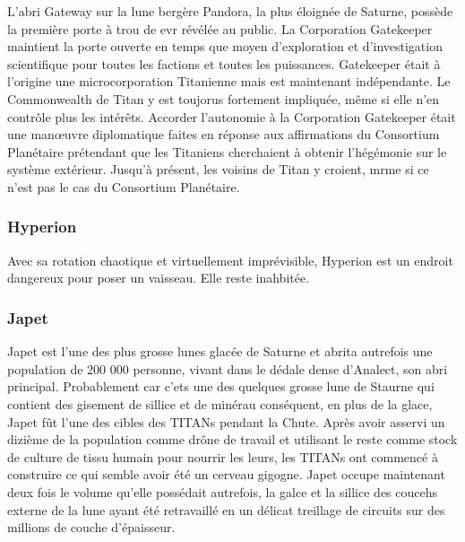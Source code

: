                                                                      L'abri Gateway sur la lune bergère Pandora, la plus éloignée de Saturne, possède la première porte à trou de evr révélée au public. La Corporation Gatekeeper maintient la porte ouverte en temps que moyen d'exploration et d'investigation scientifique pour toutes les factions et toutes les puissances. Gatekeeper était à l'origine une microcorporation Titanienne mais est maintenant indépendante. Le Commonwealth de Titan y est toujorus fortement impliquée, même si elle n'en contrôle plus les intérêts. Accorder l'autonomie à la Corporation Gatekeeper était une manœuvre diplomatique faites en réponse aux affirmations du Consortium Planétaire prétendant que les Titaniens cherchaient à obtenir l'hégémonie sur le système extérieur. Jusqu'à présent, les voisins de Titan y croient, mrme si ce n'est pas le cas du Consortium Planétaire. 

                                                                     \subsubsection{Hyperion} \label{sec:hyperion} 

                                                                     Avec sa rotation chaotique et virtuellement imprévisible, Hyperion est un endroit dangereux pour poser un vaisseau. Elle reste inahbitée. 

                                                                     \subsubsection{Japet} \label{sec:iapetus} 

                                                                     Japet est l'une des plus grosse lunes glacée de Saturne et abrita autrefois une population de 200 000 personne, vivant dans le dédale dense d'Analect, son abri principal. Probablement car c'ets une des quelques grosse lune de Staurne qui contient des gisement de sillice et de minérau conséquent, en plus de la glace, Japet fût l'une des cibles des TITANs pendant la Chute. Après avoir asservi un dizième de la population comme drône de travail et utilisant le reste comme stock de culture de tissu humain pour nourrir les leurs, les TITANs ont commencé à construire ce qui semble avoir été un cerveau gigogne. Japet occupe maintenant deux fois le volume qu'elle possédait autrefois, la galce et la sillice des coucehs externe de la lune ayant été retravaillé en un délicat treillage de circuits sur des millions de couche d'épaisseur. 


